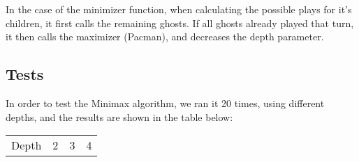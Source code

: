 \documentclass{article}
\begin{document}
In the case of the minimizer function, when calculating the possible plays for it's children, it first calls the remaining ghosts. If all ghosts already played that turn, it then calls the maximizer (Pacman), and decreases the depth parameter.

\subsection{Tests}

In order to test the Minimax algorithm, we ran it 20 times, using different depths, and the results are shown in the table below: \\

\begin{table}[ht]
  \begin{center}
  \begin{tabular}{||c||c|c|c||}
    \hline
    Depth & 2 & 3 & 4 \\

\end{tabular}
\end{center}
\end{table}
\end{document}
